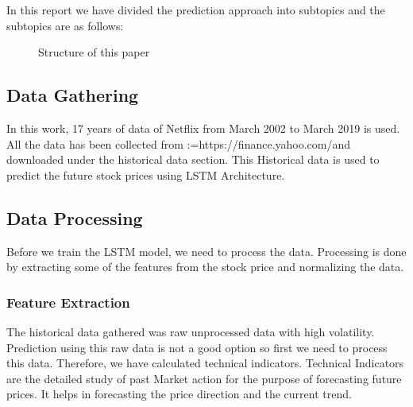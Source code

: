 \documentclass[5p,,preprint,12pt,twocolumn]{elsarticle}
\makeatletter
\def\BreakURLText#1{\@tfor\brk@tempa:=#1\do{\brk@tempa\hskip0pt}}
\def\fixFloatSize#1{}%
\makeatother
\begin{document}
In this report we have divided the prediction approach into subtopics and the subtopics are as follows:


\bgroup
\fixFloatSize{images/ff2d5313-9bc0-492d-8c3c-45f092930fcf-ustructure-of-this-paper1.jpg}
\begin{figure*}[!htbp]
\centering \makeatletter{}
\makeatother 
\caption{{Structure of this paper}}
\label{f-ccbedd1c3cc3}
\end{figure*}
\egroup




\subsection{Data Gathering}In this work, 17 years of data of Netflix from March 2002 to March 2019 is used. All the data has been collected from \BreakURLText{https://finance.yahoo.com/}\textbf{\space }and downloaded under the historical data section. This Historical data is used to predict the future stock prices using LSTM Architecture.



\subsection{Data Processing}Before we train the LSTM model, we need to process the data. Processing is done by extracting some of the features from the stock price and normalizing the data.



\subsubsection{Feature Extraction}The historical data gathered was raw unprocessed data with high volatility. Prediction using this raw data is not a good option so first we need to process this data. Therefore, we have calculated technical indicators. Technical Indicators are the detailed study of past Market action for the purpose of forecasting future prices. It helps in forecasting the price direction and the current trend.
\end{document}
